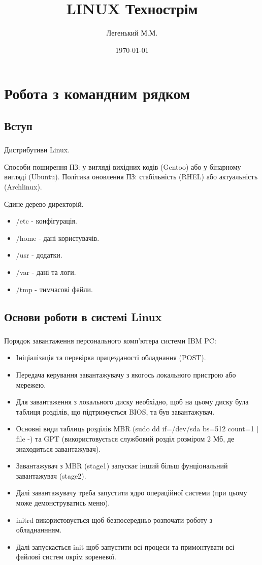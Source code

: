 \documentclass[t]{beamer}  %
\title{LINUX Технострім}
\author{Легенький М.М.}
\date{\today}
\institute[факультет радіофізики, біомедичної електроніки та комп'ютерних систем]{Харківський національний університет імені В. Н. Каразіна}
\begin{document}
\frame[plain]{\titlepage}	%

\section{Робота з командним рядком}
\subsection{Вступ}
 
\begin{frame}
	\frametitle{\insertsection} 
	\framesubtitle{\insertsubsection}
Дистрибутиви Linux.

Способи поширення ПЗ: у вигляді вихідних кодів (Gentoo) або у бінарному вигляді (Ubuntu). Політика оновлення ПЗ: стабільність (RHEL) або актуальність (Archlinux).		 

Єдине дерево директорій.
\begin{itemize}
\item /etc - конфігурація.
\item /home - дані користувачів.
\item /usr - додатки.
\item /var - дані та логи.
\item /tmp - тимчасові файли.
\end{itemize}
\end{frame}

\subsection{Основи роботи в системі Linux}
 
\begin{frame}
	\frametitle{\insertsection} 
	\framesubtitle{\insertsubsection}
Порядок завантаження персонального комп'ютера системи IBM PC:
\begin{itemize}
\item Ініціалізація та перевірка працезданості обладнання (POST).
\item Передача керування завантажувачу з якогось локального пристрою  або мережею.
\item Для завантаження з локального диску необхідно, щоб на цьому диску була таблиця розділів, що підтримується BIOS, та був завантажувач.
\item Основні види таблиць розділів MBR (sudo dd if=/dev/sda bs=512 count=1 $|$ file -) та GPT (використовується службовий розділ розміром 2 Мб, де знаходиться завантажувач). 
\item Завантажувач з MBR (stage1) запускає інший більш фунціональний завантажувач (stage2). 
\item Далі завантажувачу треба запустити ядро операційної системи (при цьому може демонструватись меню).
\item initrd використовується щоб безпосередньо розпочати роботу з обладнаннням.
\item Далі запускається init щоб запустити всі процеси та примонтувати всі файлові систем окрім кореневої.
\end{itemize}

\end{frame}
\end{document}

